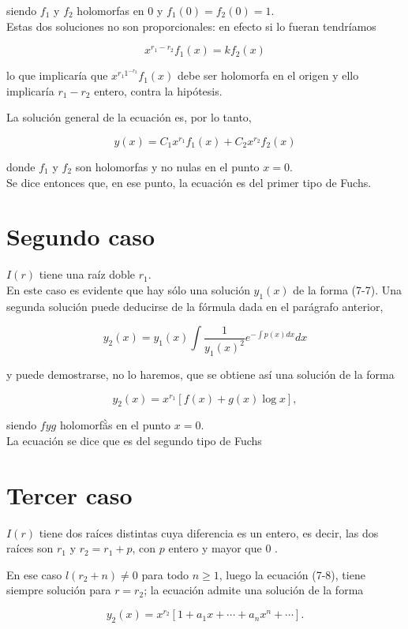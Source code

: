 \documentclass[10pt]{article}
\theoremstyle{plain}
\theoremstyle{definition}
\theoremstyle{remark}
\begin{document}
siendo $f_{1}$ y $f_{2}$ holomorfas en 0 y $f_{1}(0)=f_{2}(0)=1$.\\
Estas dos soluciones no son proporcionales: en efecto si lo fueran tendríamos

$$
x^{r_{1}-r_{2}} f_{1}(x)=k f_{2}(x)
$$

lo que implicaría que $x^{r_{1} 1^{-r_{2}}} f_{1}(x)$ debe ser holomorfa en el origen y ello implicaría $r_{1}-r_{2}$ entero, contra la hipótesis.

La solución general de la ecuación es, por lo tanto,

$$
y(x)=C_{1} x^{r_{1}} f_{1}(x)+C_{2} x^{r_{2}} f_{2}(x)
$$

donde $f_{1}$ y $f_{2}$ son holomorfas y no nulas en el punto $x=0$.\\
Se dice entonces que, en ese punto, la ecuación es del primer tipo de Fuchs.

\section*{Segundo caso}
$I(r)$ tiene una raíz doble $r_{1}$.\\
En este caso es evidente que hay sólo una solución $y_{1}(x)$ de la forma (7-7). Una segunda solución puede deducirse de la fórmula dada en el parágrafo anterior,

$$
y_{2}(x)=y_{1}(x) \int \frac{1}{y_{1}(x)^{2}} e^{-\int p(x) d x} d x
$$

y puede demostrarse, no lo haremos, que se obtiene así una solución de la forma

$$
y_{2}(x)=x^{r_{1}}[f(x)+g(x) \log x],
$$


siendo $f y g$ holomorfằs en el punto $x=0$.\\
La ecuación se dice que es del segundo tipo de Fuchs

\section*{Tercer caso}
$I(r)$ tiene dos raíces distintas cuya diferencia es un entero, es decir, las dos raíces son $r_{1}$ y $r_{2}=r_{1}+p$, con $p$ entero y mayor que 0 .

En ese caso $l\left(r_{2}+n\right) \neq 0$ para todo $n \geqslant 1$, luego la ecuación (7-8), tiene siempre solución para $r=r_{2}$; la ecuación admite una solución de la forma

$$
y_{2}(x)=x^{r_{2}}\left[1+a_{1} x+\cdots+a_{n} x^{n}+\cdots\right] .
$$
\end{document}

